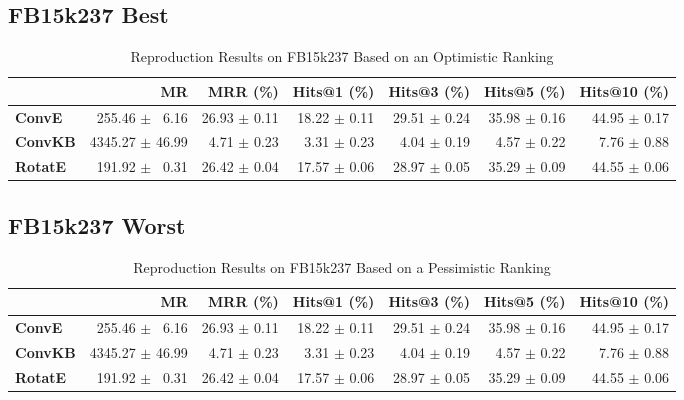 \documentclass[journal]{IEEEtran}
\begin{document}
\subsection{FB15k237 Best}
\begin{table*}
    \caption{Reproduction Results on FB15k237 Based on an Optimistic Ranking}
    \label{tab:fb15k237_full_results_optimistic_ranking}
    \centering
    \begin{tabular}{lrrrrrr}
\toprule
{} &               MR &      MRR (\%) &   Hits@1 (\%) &   Hits@3 (\%) &   Hits@5 (\%) &  Hits@10 (\%) \\
\midrule
\textbf{ConvE } &  $\phantom{5}$255.46 $\pm$ $\phantom{5}$6.16 &  26.93 $\pm$ 0.11 &  18.22 $\pm$ 0.11 &  29.51 $\pm$ 0.24 &  35.98 $\pm$ 0.16 &  44.95 $\pm$ 0.17 \\
\textbf{ConvKB} &  4345.27 $\pm$ 46.99 &  $\phantom{5}$4.71 $\pm$ 0.23 &  $\phantom{5}$3.31 $\pm$ 0.23 &  $\phantom{5}$4.04 $\pm$ 0.19 &  $\phantom{5}$4.57 $\pm$ 0.22 &  $\phantom{5}$7.76 $\pm$ 0.88 \\
\textbf{RotatE} &  $\phantom{5}$191.92 $\pm$ $\phantom{5}$0.31 &  26.42 $\pm$ 0.04 &  17.57 $\pm$ 0.06 &  28.97 $\pm$ 0.05 &  35.29 $\pm$ 0.09 &  44.55 $\pm$ 0.06 \\
\bottomrule
\end{tabular}

\end{table*}
\subsection{FB15k237 Worst}
    \begin{table*}
        \caption{Reproduction Results on FB15k237 Based on a Pessimistic Ranking}
        \label{tab:fb15k237_full_results_pessimistic_ranking}
        \centering
        \begin{tabular}{lrrrrrr}
\toprule
{} &               MR &      MRR (\%) &   Hits@1 (\%) &   Hits@3 (\%) &   Hits@5 (\%) &  Hits@10 (\%) \\
\midrule
\textbf{ConvE } &  $\phantom{5}$255.46 $\pm$ $\phantom{5}$6.16 &  26.93 $\pm$ 0.11 &  18.22 $\pm$ 0.11 &  29.51 $\pm$ 0.24 &  35.98 $\pm$ 0.16 &  44.95 $\pm$ 0.17 \\
\textbf{ConvKB} &  4345.27 $\pm$ 46.99 &  $\phantom{5}$4.71 $\pm$ 0.23 &  $\phantom{5}$3.31 $\pm$ 0.23 &  $\phantom{5}$4.04 $\pm$ 0.19 &  $\phantom{5}$4.57 $\pm$ 0.22 &  $\phantom{5}$7.76 $\pm$ 0.88 \\
\textbf{RotatE} &  $\phantom{5}$191.92 $\pm$ $\phantom{5}$0.31 &  26.42 $\pm$ 0.04 &  17.57 $\pm$ 0.06 &  28.97 $\pm$ 0.05 &  35.29 $\pm$ 0.09 &  44.55 $\pm$ 0.06 \\
\bottomrule
\end{tabular}

    \end{table*}
\end{document}
